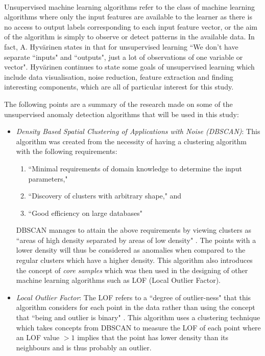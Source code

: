 \documentclass[12pt, twoside]{report}
\begin{document}
	\paragraph{ }Unsupervised machine learning algorithms refer to the class of machine learning algorithms where only the input features are available to the learner as there is no access to output labels corresponding to each input feature vector, or the aim of the algorithm is simply to observe or detect patterns in the available data. In fact, A. Hyv{\"a}rinen states in \cite{r:lecturenotes} that for unsupervised learning ``We don't have separate ``inputs" and ``outputs", just a lot of observations of one variable or vector". Hyv{\"a}rinen continues to state some goals of unsupervised learning which include data visualisation, noise reduction, feature extraction and finding interesting components, which are all of particular interest for this study.
	\par The following points are a summary of the research made on some of the unsupervised anomaly detection algorithms that will be used in this study:
	\begin{itemize} 
		\item \textit{Density Based Spatial Clustering of Applications with Noise (DBSCAN)}: This algorithm was created from the necessity of having a clustering algorithm with the following requirements:
		\begin{enumerate}
			\item ``Minimal requirements of domain knowledge to determine the input parameters,"
			\item ``Discovery of clusters with arbitrary shape," and
			\item ``Good efficiency on large databases" \cite{r:DBSCAN}
		\end{enumerate}
		DBSCAN manages to attain the above requirements by viewing clusters as ``areas of high density separated by areas of low density" \cite{r:skclustering}. The points with a lower density will thus be considered as anomalies when compared to the regular clusters which have a higher density. This algorithm also introduces the concept of \textit{core samples} which was then used in the designing of other machine learning algorithms such as LOF (Local Outlier Factor).
		\item \textit{Local Outlier Factor}: The LOF refers to a ``degree of outlier-ness" that this algorithm considers for each point in the data rather than using the concept that ``being and outlier is binary" \cite{r:LOF}. This algorithm uses a clustering technique which takes concepts from DBSCAN to measure the LOF of each point where an LOF value $>1$ implies that the point has lower density than its neighbours and is thus probably an outlier. 
	\end{itemize}
	
\end{document}
